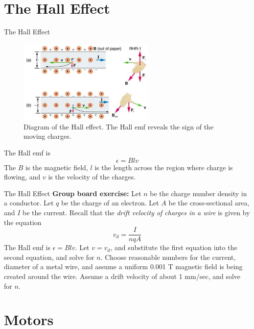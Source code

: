 \documentclass{beamer}
\begin{document}
\section{The Hall Effect}

\begin{frame}{The Hall Effect}
\begin{figure}
\centering
\includegraphics[width=0.6\textwidth]{figures/hall.png}
\caption{\label{fig:hall} Diagram of the Hall effect.  The Hall emf reveals the sign of the moving charges.}
\end{figure}
The Hall emf is 
\begin{equation}
\epsilon = Blv
\end{equation}
The $B$ is the magnetic field, $l$ is the length across the region where charge is flowing, and $v$ is the velocity of the charges.
\end{frame}

\begin{frame}{The Hall Effect}
\textbf{Group board exercise:} Let $n$ be the charge number density in a conductor.  Let $q$ be the charge of an electron.  Let $A$ be the cross-sectional area, and $I$ be the current.  Recall that the \textit{drift velocity of charges in a wire} is given by the equation
\begin{equation}
v_d = \frac{I}{nqA}
\end{equation}
The Hall emf is $\epsilon = Blv$.  Let $v = v_d$, and substitute the first equation into the second equation, and solve for $n$.  Choose reasonable numbers for the current, diameter of a metal wire, and assume a uniform 0.001 T magnetic field is being created around the wire.  Assume a drift velocity of about 1 mm/sec, and solve for $n$.
\end{frame}

\section{Motors}
\end{document}
